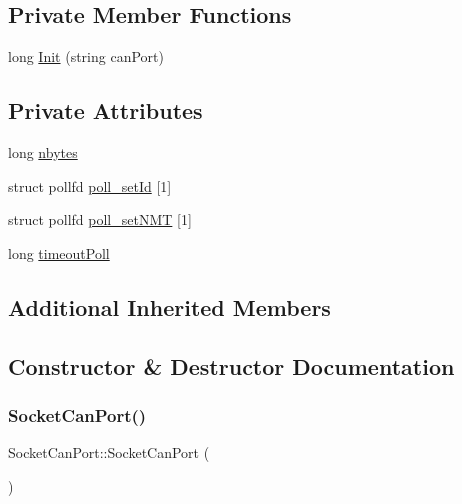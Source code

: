 \subsection*{Private Member Functions}
\begin{DoxyCompactItemize}
\item 
long \hyperlink{classSocketCanPort_a9209d295c98c12ab85ec61773b775bf4}{Init} (string can\+Port)
\end{DoxyCompactItemize}
\subsection*{Private Attributes}
\begin{DoxyCompactItemize}
\item 
long \hyperlink{classSocketCanPort_a7b06b4d8c897c1a189329f20632fdb71}{nbytes}
\item 
struct pollfd \hyperlink{classSocketCanPort_ad0374fe5ea78a061e7abd16b812f44d5}{poll\+\_\+set\+Id} \mbox{[}1\mbox{]}
\item 
struct pollfd \hyperlink{classSocketCanPort_afaaf9cd49684de93be7370988ec64b47}{poll\+\_\+set\+N\+MT} \mbox{[}1\mbox{]}
\item 
long \hyperlink{classSocketCanPort_a18e670bf7f98482e022da2fd11264309}{timeout\+Poll}
\end{DoxyCompactItemize}
\subsection*{Additional Inherited Members}


\subsection{Constructor \& Destructor Documentation}
\mbox{\label{classSocketCanPort_af3593609acea236b10646732e277837f}} 
\subsubsection{\texorpdfstring{Socket\+Can\+Port()}{SocketCanPort()}\hspace{0.1cm}{\footnotesize\ttfamily [1/2]}}
{\footnotesize\ttfamily Socket\+Can\+Port\+::\+Socket\+Can\+Port (\begin{DoxyParamCaption}{ }\end{DoxyParamCaption})}

